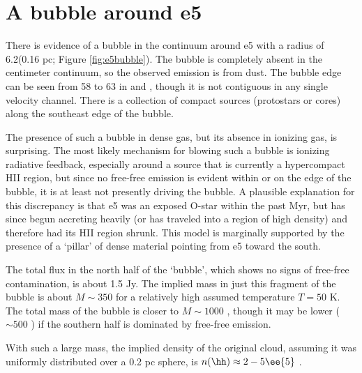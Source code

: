 \documentclass[twocolumn]{aastex61}
\begin{document}
\section{A bubble around e5}
\label{sec:e5bubble}
There is evidence of a bubble in the continuum around e5 with a radius of
6.2\arcsec (0.16 pc; Figure \ref{fig:e5bubble}).  The bubble is completely
absent in the centimeter continuum, so the observed emission is from dust.  The
bubble edge can be seen from 58 \kms to 63 \kms in \ceighteeno and
\formaldehyde, though it is not contiguous in any single velocity channel.
There is a collection of compact sources (protostars or cores) along the
southeast edge of the bubble.

The presence of such a bubble in dense gas, but its absence in ionizing gas, is
surprising.  The most likely mechanism for blowing such a bubble is ionizing
radiative feedback, especially around a source that is currently a hypercompact
HII region, but since no free-free emission is evident within or on the edge of
the bubble, it is at least not presently driving the bubble.  A plausible
explanation for this discrepancy is that e5 was an exposed O-star within the
past Myr, but has since begun accreting heavily (or has traveled into a region
of high density) and therefore had its HII
region shrunk.  This model is marginally supported by the presence of a `pillar'
of dense material pointing from e5 toward the south.

The total flux in the north half of the `bubble', which shows no signs of
free-free contamination, is about 1.5 Jy.  The implied mass in just this
fragment of the bubble is about $M\sim350$ \msun for a relatively high assumed
temperature $T=50$ K.  The total mass of the bubble is closer to $M\sim1000$
\msun, though it may be lower ($\sim500$ \msun) if the southern half is
dominated by free-free emission.

With such a large mass, the implied density of the original cloud, assuming it
was uniformly distributed over a 0.2 pc sphere, is $n(\hh) \approx 2-5\ee{5}$
\percc.
\end{document}
